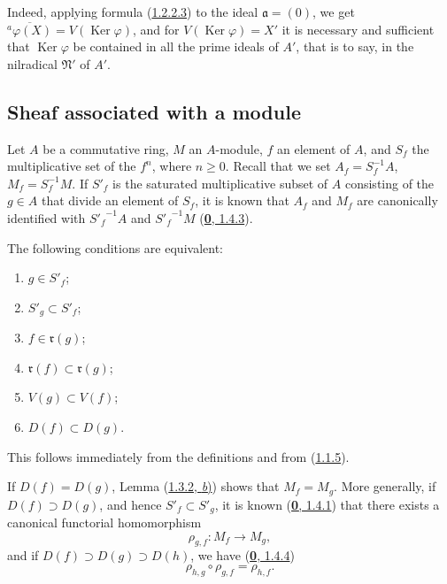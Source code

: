 Indeed, applying formula (\hyperref[I.1.2.2.3]{1.2.2.3}) to the ideal
$\mathfrak{a}=(0)$, we get
$\overline{{}^a\varphi(X)}=V(\operatorname{Ker}\varphi)$, and for
$V(\operatorname{Ker}\varphi)=X'$ it is necessary and sufficient that
$\operatorname{Ker}\varphi$ be contained in all the prime ideals of
$A'$, that is to say, in the nilradical $\mathfrak{N}'$ of $A'$.

\subsection{Sheaf associated with a module}
\label{subsection:I.1.3}
\label{I.1.3}

\begin{env}[1.3.1]
\label{I.1.3.1}
Let $A$ be a commutative ring, $M$ an $A$-module, $f$ an element of $A$, and
$S_f$ the multiplicative set of the $f^n$, where $n\geq0$. Recall that we
set $A_f=S_f^{-1}A$, $M_f=S_f^{-1}M$. If $S'_f$ is the saturated
multiplicative subset of $A$ consisting of the $g\in A$ that divide an
element of $S_f$, it is known that $A_f$ and $M_f$ are canonically identified
with ${S'_f}^{-1}A$ and ${S'_f}^{-1}M$
(\hyperref[0.1.4.3]{\textbf{0}, 1.4.3}).
\end{env}

\begin{lemma}[1.3.2]
\label{I.1.3.2}
The following conditions are equivalent:
\begin{enumerate}
  \item[\textit{a})] $g\in S'_f$;
  \item[\textit{b})] $S'_g\subset S'_f$;
  \item[\textit{c})] $f\in\mathfrak{r}(g)$;
  \item[\textit{d})] $\mathfrak{r}(f)\subset\mathfrak{r}(g)$;
  \item[\textit{e})] $V(g)\subset V(f)$;
  \item[\textit{f})] $D(f)\subset D(g)$.
\end{enumerate}
\end{lemma}

This follows immediately from the definitions and from
(\hyperref[I.1.1.5]{1.1.5}).

\begin{env}[1.3.3]
\label{I.1.3.3}
If $D(f)=D(g)$, Lemma (\hyperref[I.1.3.2]{1.3.2, \textit b)}) shows that
$M_f=M_g$. More generally, if $D(f)\supset D(g)$, and hence
$S'_f\subset S'_g$, it is known (\hyperref[0.1.4.1]{\textbf{0}, 1.4.1}) that there
exists a canonical functorial homomorphism
\[
  \rho_{g,f}:M_f\longrightarrow M_g,
\]
and if $D(f)\supset D(g)\supset D(h)$, we have
(\hyperref[0.1.4.4]{\textbf{0}, 1.4.4})
\begin{equation}
  \rho_{h,g}\circ\rho_{g,f}=\rho_{h,f}.
  \tag{1.3.3.1}\label{I.1.3.3.1}
\end{equation}
\end{env}

